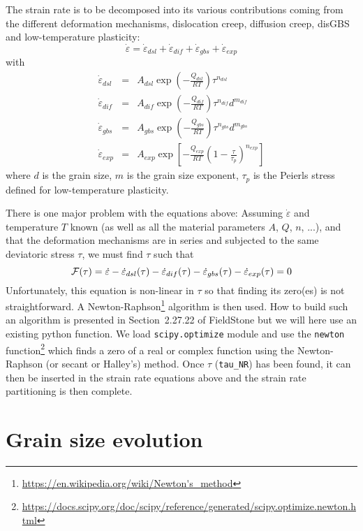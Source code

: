 \documentclass[a4paper]{article}
\begin{document}
The strain rate is to be decomposed into its various contributions 
coming from the different deformation mechanisms, dislocation creep,
diffusion creep, disGBS and low-temperature plasticity:
\[
\dot\varepsilon = \dot\varepsilon_{dsl} + \dot\varepsilon_{dif} + 
\dot\varepsilon_{gbs} + \dot\varepsilon_{exp} 
\]
with
\begin{eqnarray}
\dot{\varepsilon}_{dsl}&=&A_{dsl}\exp\left(-\frac{Q_{dsl}}{RT} \right) \tau^{n_{dsl}}  \\
\dot{\varepsilon}_{dif}&=&A_{dif}\exp\left(-\frac{Q_{dif}}{RT} \right) \tau^{n_{dif}} d^{m_{dif}} \\
\dot{\varepsilon}_{gbs}&=&A_{gbs}\exp\left(-\frac{Q_{gbs}}{RT} \right) \tau^{n_{gbs}} d^{m_{gbs}} \\
\dot{\varepsilon}_{exp}&=&A_{exp}\exp\left[-\frac{Q_{exp}}{RT} \left(1 -\frac{\tau}{\tau_p}\right)^{n_{exp}} \right]   
\end{eqnarray}
where $d$ is the grain size, $m$ is the grain size exponent, $\tau_p$ is the Peierls stress defined
for low-temperature plasticity.


There is one major problem with the equations above:
Assuming $\dot\varepsilon$ and temperature $T$ known (as well as all the material parameters $A$, $Q$, $n$, ...),
and that the deformation mechanisms are in series and subjected to the same deviatoric stress $\tau$,
we must find $\tau$ such that
\[
{\cal F}(\tau) = \dot\varepsilon -  \dot\varepsilon_{dsl}(\tau) 
-\dot\varepsilon_{dif}(\tau) -\dot\varepsilon_{gbs}(\tau) - \dot\varepsilon_{exp}(\tau) =0
\]
Unfortunately, this equation is non-linear in $\tau$ so that finding its zero(es) is not
straightforward. A Newton-Raphson\footnote{\url{https://en.wikipedia.org/wiki/Newton's_method}}
algorithm is then used. How to build such an algorithm is presented in Section~2.27.22 of FieldStone
but we will here use an existing python function.
We load \lstinline{scipy.optimize} module and use the \lstinline{newton} function\footnote{\url{
https://docs.scipy.org/doc/scipy/reference/generated/scipy.optimize.newton.html}}
which finds a zero of a real or complex function using the Newton-Raphson (or secant or Halley’s) method.
Once $\tau$ (\lstinline{tau_NR}) has been found, it can then be inserted in the strain rate equations above and
the strain rate partitioning is then complete.


\section{Grain size evolution \label{seq:gsev}}
\end{document}

